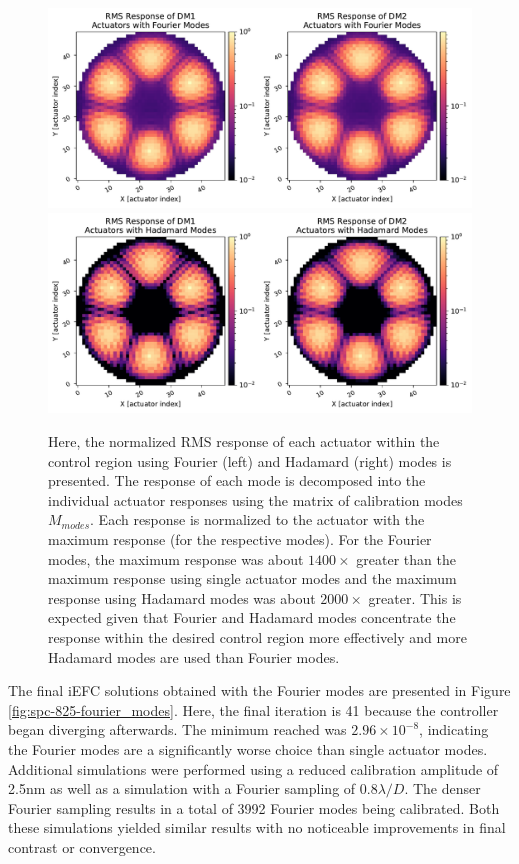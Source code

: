 \documentclass[12pt]{spieman}  %
\begin{document}
\begin{spacing}{2}
\begin{figure}[h]
    \centering
    \includegraphics[scale=0.35]{response-maps/fourier_mode_responses.pdf}
    \includegraphics[scale=0.35]{response-maps/had_mode_responses.pdf}
    \caption{Here, the normalized RMS response of each actuator within the control region using Fourier (left) and  Hadamard (right) modes is presented. The response of each mode is decomposed into the individual actuator responses using the matrix of calibration modes $M_{modes}$. Each response is normalized to the actuator with the maximum response (for the respective modes). For the Fourier modes, the maximum response was about $1400\times$ greater than the maximum response using single actuator modes and the maximum response using Hadamard modes was about $2000\times$ greater. This is expected given that Fourier and Hadamard modes concentrate the response within the desired control region more effectively and more Hadamard modes are used than Fourier modes.}
    \label{fig:had-fourier-responses}
\end{figure}

The final iEFC solutions obtained with the Fourier modes are presented in Figure \ref{fig:spc-825-fourier_modes}. Here, the final iteration is 41 because the controller began diverging afterwards. The minimum reached was $2.96\times10^{-8}$, indicating the Fourier modes are a significantly worse choice than single actuator modes. Additional simulations were performed using a reduced calibration amplitude of 2.5nm as well as a simulation with a Fourier sampling of $0.8\lambda/D$. The denser Fourier sampling results in a total of 3992 Fourier modes being calibrated. Both these simulations yielded similar results with no noticeable improvements in final contrast or convergence. 


\end{spacing}
\end{document}
